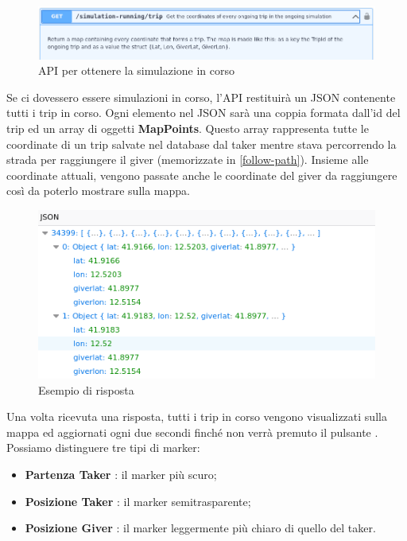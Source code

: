 \documentclass[main.tex]{subfiles}
\begin{document}
\begin{figure}[H]
    \centering
    \includegraphics[width=1\linewidth]     {img/simulazione/web/runningGet.png}
    \caption{API per ottenere la simulazione in corso}
     \label{fig:runningGet}
\end{figure}

Se ci dovessero essere simulazioni in corso, l'API restituirà un JSON contenente tutti i trip in corso. Ogni elemento nel JSON sarà una coppia formata dall'id del trip ed un array di oggetti \textbf{MapPoints}. Questo array rappresenta tutte le coordinate di un trip salvate nel database dal taker mentre stava percorrendo la strada per raggiungere il giver (memorizzate in \ref{follow-path}). Insieme alle coordinate attuali, vengono passate anche le coordinate del giver da raggiungere così da poterlo mostrare sulla mappa.



\begin{figure}[H]
    \centering
    \includegraphics[width=1\linewidth]     {img/simulazione/web/response.png}
    \caption{Esempio di risposta}
     \label{fig:runningResponse}
\end{figure}

Una volta ricevuta una risposta, tutti i trip in corso vengono visualizzati sulla mappa ed aggiornati ogni due secondi finché non verrà premuto il pulsante .\newline
Possiamo distinguere tre tipi di marker:

\begin{itemize}
    \item \textbf{Partenza Taker} : il marker più scuro;
    \item \textbf{Posizione Taker} : il marker semitrasparente;
    \item \textbf{Posizione Giver} : il marker leggermente più chiaro di quello del taker.
\end{itemize}
\end{document}
